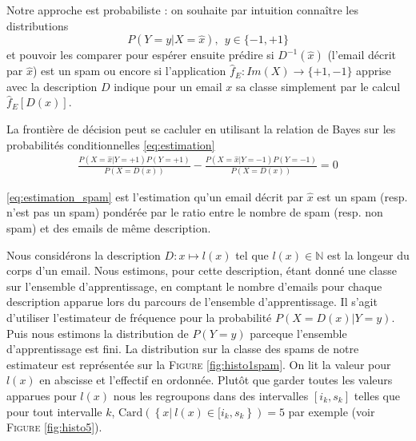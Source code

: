 \documentclass[a4paper, french]{article}
\begin{document}
Notre approche est probabiliste : on souhaite par intuition conna\^itre les distributions 
\label{eq:estimation}
\begin{equation}P(Y=y|X=\hat{x}),\ \ y\in\{-1,+1\}\end{equation}
et pouvoir les comparer pour esp\'erer ensuite pr\'edire si $D^{-1}(\hat{x})$ (l'email d\'ecrit par $\hat{x}$) est un spam ou encore si l'application $\hat{f}_E\colon Im(X)\rightarrow \{+1,-1\}$ apprise avec la description $D$ indique pour un email $x$ sa classe simplement par le calcul $\hat{f}_E[ D(x)]$.

La fronti\`ere de d\'ecision peut se cacluler en utilisant la relation de Bayes sur les probabilit\'es conditionnelles \eqref{eq:estimation}
\begin{align}
\label{eq:estimation_spam}
\frac{P(X=\hat{x}|Y=+1)P(Y=+1)}{P(X=D(x))}
- \frac{P(X=\hat{x}|Y=-1)P(Y=-1)}{P(X=D(x))}=0
\end{align}

\eqref{eq:estimation_spam} est l'estimation qu'un email d\'ecrit par $\hat{x}$ est un spam (resp. n'est pas un spam) pond\'er\'ee par le ratio entre le nombre de spam (resp. non spam) et des emails de m\^eme description.

Nous consid\'erons la description $D\colon x\mapsto l(x)$ 
tel que $l(x)\in \mathbb{N}$ est la longeur du corps d'un email. 
Nous estimons, pour cette description, \'etant donn\'e une classe 
sur l'ensemble d'apprentissage, en comptant le nombre d'emails 
pour chaque description apparue lors du parcours de l'ensemble d'apprentissage. 
Il s'agit d'utiliser l'estimateur de fr\'equence pour la probabilit\'e 
$P(X=D(x)|Y=y)$. Puis nous estimons la distribution de $P(Y=y)$ parceque 
l'ensemble d'apprentissage est fini. 
La distribution sur la classe des spams de notre estimateur est 
repr\'esent\'ee sur la F\textsc{igure} \ref{fig:histo1spam}.
On lit la valeur pour $l(x)$ en abscisse et l'effectif en ordonn\'ee.
Plut\^ot que garder toutes les valeurs apparues pour $l(x)$ nous les regroupons 
dans des intervalles $[i_k,s_k]$ telles que pour tout intervalle $k$, 
$\text{Card}\left(\left\{x|\ l(x)\in [i_k,s_k\right\}\right)=5$ par exemple
(voir F\textsc{igure} \ref{fig:histo5}).
\end{document}
